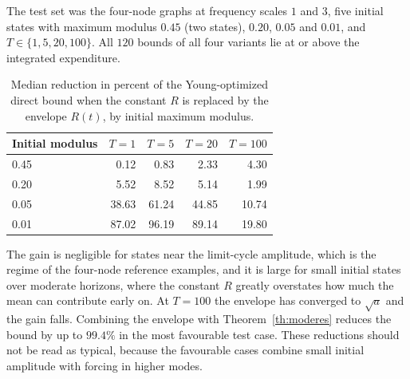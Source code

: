 \documentclass[11pt,notitlepage]{report}
\theoremstyle{definition}
\theoremstyle{remark}
\begin{document}
The test set was the four-node graphs at frequency scales $1$ and $3$, five initial states with maximum modulus $0.45$ (two states), $0.20$, $0.05$ and $0.01$, and $T\in\{1,5,20,100\}$. All $120$ bounds of all four variants lie at or above the integrated expenditure.
\begin{table}[ht]\centering\small
\caption{Median reduction in percent of the Young-optimized direct bound when the constant $R$ is replaced by the envelope $R(t)$, by initial maximum modulus.}
\begin{tabular}{lrrrr}\toprule
Initial modulus&$T=1$&$T=5$&$T=20$&$T=100$\\\midrule
0.45&0.12&0.83&2.33&4.30\\
0.20&5.52&8.52&5.14&1.99\\
0.05&38.63&61.24&44.85&10.74\\
0.01&87.02&96.19&89.14&19.80\\\bottomrule
\end{tabular}
\end{table}
The gain is negligible for states near the limit-cycle amplitude, which is the regime of the four-node reference examples, and it is large for small initial states over moderate horizons, where the constant $R$ greatly overstates how much the mean can contribute early on. At $T=100$ the envelope has converged to $\sqrt a$ and the gain falls. Combining the envelope with Theorem~\ref{th:moderes} reduces the bound by up to $99.4\%$ in the most favourable test case. These reductions should not be read as typical, because the favourable cases combine small initial amplitude with forcing in higher modes.
\end{document}
